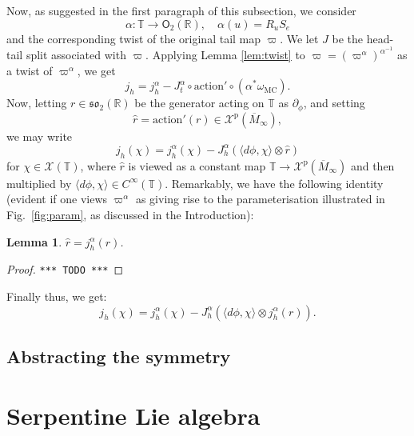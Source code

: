 \documentclass{article}
\def\MISS{\texttt{*** TODO ***}}
\def\fso{\mathfrak{so}}
\def\RR{\mathbb{R}}
\def\TT{\mathbb{T}}
\def\XX{\mathcal{X}}
\def\O{\mathsf{O}}
\def\p{\mathrm{p}}
\newtheorem{lem}{Lemma}
\theoremstyle{definition}
\begin{document}
Now, as suggested in the first paragraph of this subsection,
we consider
$$ \alpha : \TT \to \O_2(\RR),\quad \alpha(u) = R_u S_e $$
and the corresponding twist of the original tail map
$\varpi$. We let $J$ be the head-tail split
associated with $\varpi$. Applying Lemma \ref{lem:twist}
to $\varpi=(\varpi^\alpha)^{\alpha^{-1}}$ as a twist of $\varpi^\alpha$,
we get
$$
 j_h = j^\alpha_h - J^\alpha_t \circ \mathrm{action}' \circ (\alpha^*\omega_{\mathrm{MC}}).
$$
Now, letting $r \in \fso_2(\RR)$ be the generator acting on $\TT$ as $\partial_\phi$,
and setting $$\widehat r = \mathrm{action}'(r) \in \XX^\p(\overline M_\infty),$$
we may write
$$
j_h (\chi) =
j^\alpha_h(\chi) - J^\alpha_h \left( \langle d\phi,\chi\rangle \otimes \widehat r\right)
$$
for $\chi \in \XX(\TT)$, where $\widehat r$
is viewed as a constant map $\TT \to \XX^\p(\overline M_\infty)$ and
then multiplied by $\langle d\phi,\chi\rangle \in C^\infty(\TT)$.
Remarkably, we have the following identity (evident if one 
views $\varpi^\alpha$ as giving rise to the parameterisation
illustrated in
Fig.~\ref{fig:param}, as discussed in the Introduction):
\begin{lem}
        $\widehat r = j^\alpha_h(r)$.
\end{lem}
\begin{proof}
\MISS
\end{proof}
Finally thus, we get:
$$
j_h(\chi) = j^\alpha_h(\chi) - J^\alpha_h(\langle d\phi,\chi\rangle \otimes j^\alpha_h(r)).
$$

\subsection{Abstracting the symmetry}


\section{Serpentine Lie algebra}
\label{sec:algebra}
\end{document}
